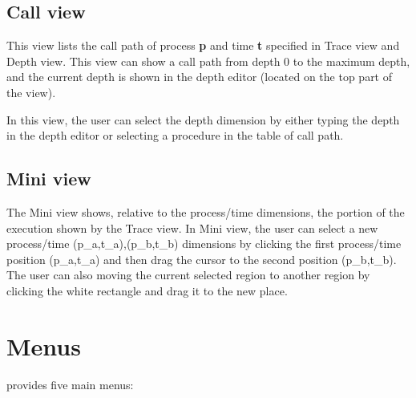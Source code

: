 \documentclass[english]{article}
\begin{document}
\subsection{Call view}

This view lists the call path of process \textbf{p} and time \textbf{t} specified in Trace view and Depth view.
This view can show a call path from depth $0$ to the maximum depth, and the current depth is shown in the depth editor (located on the top part of the view).

In this view, the user can select the depth dimension by either typing the depth in the depth editor or selecting a procedure in the table of call path.

\subsection{Mini view}

The Mini view shows, relative to the process/time dimensions, the portion of the execution shown by the Trace view.
In Mini view, the user can select a new process/time (p_a,t_a),(p_b,t_b) dimensions by clicking the first process/time position (p_a,t_a) and then drag the cursor to the second position (p_b,t_b).
The user can also moving the current selected region to another region by clicking the white rectangle and drag it to the new place.





\section{Menus}

 provides five main menus:

\end{document}
